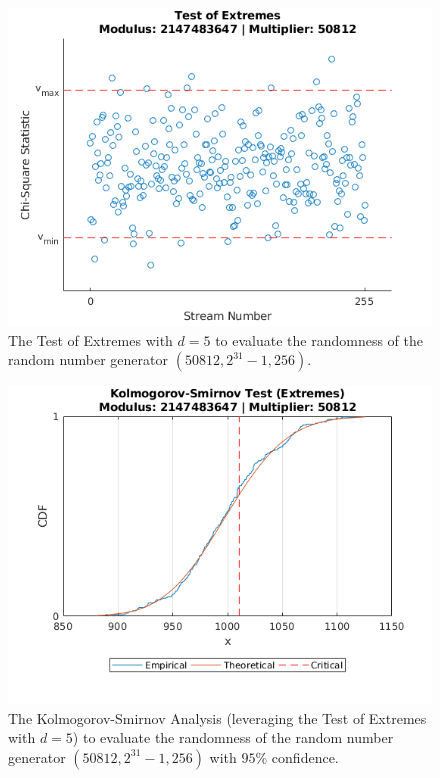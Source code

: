\begin{figure}
	\includegraphics[width=\columnwidth]{fig/evaluation-randomness-extremes-50812}
	\caption{The Test of Extremes with $d=5$ to evaluate the randomness of the random number generator $(50812,2^{31}-1, 256)$.}
	\label{fig:evaluation-randomness-extremes-50812}
\end{figure}

\begin{figure}
	\includegraphics[width=\columnwidth]{fig/evaluation-randomness-kolmogorov-smirnov-50812}
	\caption{The Kolmogorov-Smirnov Analysis (leveraging the Test of Extremes with $d=5$) to evaluate the randomness of the random number generator $(50812,2^{31}-1, 256)$ with $95\%$ confidence.}
	\label{fig:evaluation-randomness-kolmogorov-smirnov-50812}
\end{figure}